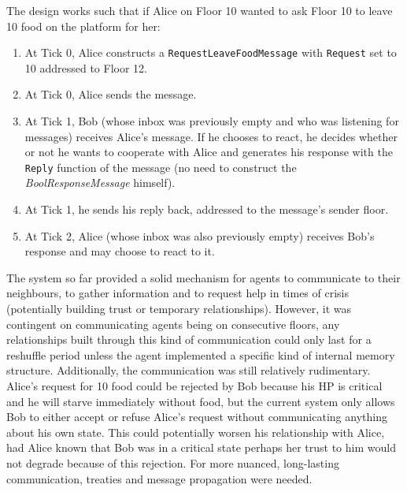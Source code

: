 The design works such that if Alice on Floor 10 wanted to ask Floor 10 to leave 10 food on the platform for her:
\begin{enumerate}
    \item At Tick 0, Alice constructs a \texttt{RequestLeaveFoodMessage} with \texttt{Request} set to 10 addressed to Floor 12.
    \item At Tick 0, Alice sends the message.
    \item At Tick 1, Bob (whose inbox was previously empty and who was listening for messages) receives Alice's message. If he chooses to react, he decides whether or not he wants to cooperate with Alice and generates his response with the \texttt{Reply} function of the message (no need to construct the \textit{BoolResponseMessage} himself).
    \item At Tick 1, he sends his reply back, addressed to the message's sender floor.
    \item At Tick 2, Alice (whose inbox was also previously empty) receives Bob's response and may choose to react to it.
\end{enumerate}
The system so far provided a solid mechanism for agents to communicate to their neighbours, to gather information and to request help in times of crisis (potentially building trust or temporary relationships). However, it was contingent on communicating agents being on consecutive floors, any relationships built through this kind of communication could only last for a reshuffle period unless the agent implemented a specific kind of internal memory structure. Additionally, the communication was still relatively rudimentary. Alice's request for 10 food could be rejected by Bob because his HP is critical and he will starve immediately without food, but the current system only allows Bob to either accept or refuse Alice's request without communicating anything about his own state. This could potentially worsen his relationship with Alice, had Alice known that Bob was in a critical state perhaps her trust to him would not degrade because of this rejection. \newline 
For more nuanced, long-lasting communication, treaties and message propagation were needed.

